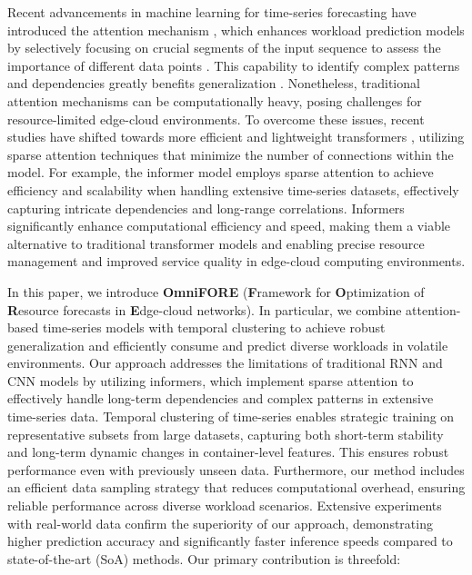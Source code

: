 \documentclass{ieeetmlcn}
\begin{document}
Recent advancements in machine learning for time-series forecasting have introduced the attention mechanism \cite{vaswani2017attention}, which enhances workload prediction models by selectively focusing on crucial segments of the input sequence to assess the importance of different data points \cite{gort2023forecasting}. This capability to identify complex patterns and dependencies greatly benefits generalization \cite{9889720}. Nonetheless, traditional attention mechanisms can be computationally heavy, posing challenges for resource-limited edge-cloud environments. To overcome these issues, recent studies have shifted towards more efficient and lightweight transformers \cite{fasterandlightertransformers}, utilizing sparse attention techniques \cite{gorbett2023sparse, STRec, ma2024multivariate} that minimize the number of connections within the model. For example, the informer model \cite{zhou2021informer} employs sparse attention to achieve efficiency and scalability when handling extensive time-series datasets, effectively capturing intricate dependencies and long-range correlations. Informers significantly enhance computational efficiency and speed, making them a viable alternative to traditional transformer models and enabling precise resource management and improved service quality in edge-cloud computing environments.

In this paper, we introduce \textbf{OmniFORE} (\textbf{F}ramework for \textbf{O}ptimization of \textbf{R}esource forecasts in \textbf{E}dge-cloud networks). In particular, we combine attention-based time-series models with temporal clustering to achieve robust generalization and efficiently consume and predict diverse workloads in volatile environments. Our approach addresses the limitations of traditional RNN and CNN models by utilizing informers, which implement sparse attention to effectively handle long-term dependencies and complex patterns in extensive time-series data. Temporal clustering of time-series enables strategic training on representative subsets from large datasets, capturing both short-term stability and long-term dynamic changes in container-level features. This ensures robust performance even with previously unseen data. Furthermore, our method includes an efficient data sampling strategy that reduces computational overhead, ensuring reliable performance across diverse workload scenarios. Extensive experiments with real-world data confirm the superiority of our approach, demonstrating higher prediction accuracy and significantly faster inference speeds compared to state-of-the-art (SoA) methods. Our primary contribution is threefold:
\end{document}
